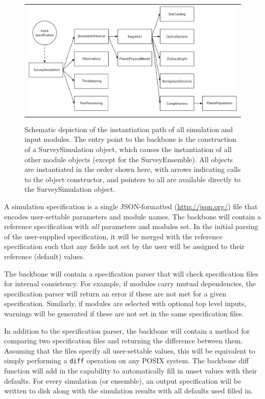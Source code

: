 \documentclass[cleanfoot]{asme2ej}
\begin{document}
\begin{figure}[ht]
    \begin{center}
        \begin{tabular}{c}
             \includegraphics[width=1\textwidth]{instantiation_tree}
        \end{tabular}
    \end{center}
    \caption{Schematic depiction of the instantiation path of all simulation and input modules.  The entry point to the backbone is the construction of a SurveySimulation object, which causes the instantiation of all other module objects (except for the SurveyEnsemble).  All objects are instantiated in the order shown here, with arrows indicating calls to the object constructor, and pointers to all are available directly to the SurveySimulation object.}
    \label{fig:instantiation_tree}
\end{figure}

A simulation specification is a single JSON-formatted (\url{http://json.org/}) file that encodes user-settable parameters and module names.  The backbone will contain a reference specification with \emph{all} parameters and modules set.  In the initial parsing of the user-supplied specification, it will be merged with the reference specification such that any fields not set by the user will be assigned to their reference (default) values.   

The backbone will contain a specification parser that will check specification files for internal consistency.  For example, if modules carry mutual dependencies, the specification parser will return an error if these are not met for a given specification.  Similarly, if modules are selected with optional top level inputs, warnings will be generated if these are not set in the same specification files.

In addition to the specification parser, the backbone will contain a method for comparing two specification files and returning the difference between them.  Assuming that the files specify all user-settable values, this will be equivalent to simply performing a \verb+diff+ operation on any POSIX system.  The backbone diff function will add in the capability to automatically fill in unset values with their defaults.  For every simulation (or ensemble), an output specification will be written to disk along with the simulation results with all defaults used filled in.
\end{document}
